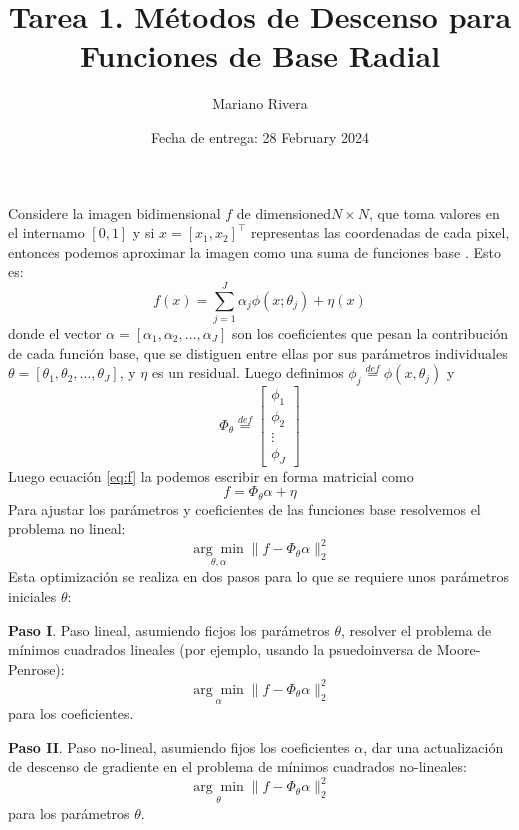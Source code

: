 \documentclass{article}
\title{Tarea 1. Métodos de Descenso para Funciones de Base Radial}
\author{Mariano Rivera}
\date{Fecha de entrega: 28 February 2024}
\newcommand{\define}{\overset{def}{=}}
\begin{document}
\maketitle

Considere la imagen bidimensional $f$ de dimensioned${N \times N}$, que toma valores en el internamo $[0,1]$ y si $x= [x_1,x_2]^\top$ representas las coordenadas de cada pixel, entonces podemos aproximar la imagen como una suma de funciones base . Esto es:
\begin{equation}
f(x) = \sum_{j=1}^J \alpha_j \phi(x; \theta_j) + \eta(x)    
\label{eq:f}
\end{equation}
donde el vector $\alpha = [\alpha_1, \alpha_2, \ldots, \alpha_J ]$ son los coeficientes que pesan la contribución de cada función base, que se distiguen entre ellas por sus parámetros individuales $\theta = [\theta_1, \theta_2, \ldots, \theta_J ]$, y $\eta$ es un residual. Luego definimos $\phi_j \define \phi(x, \theta_j)$ y
\begin{equation}
    \label{eq_phi}
    \Phi_\theta \define \begin{bmatrix}
        \phi_1 \\
        \phi_2 \\
        \vdots \\
        \phi_J
    \end{bmatrix}
\end{equation}
Luego ecuación \eqref{eq:f} la podemos escribir en forma matricial como
$$
f = \Phi_{\theta} \alpha + \eta
$$
Para ajustar los parámetros y coeficientes de las funciones base resolvemos el problema no lineal:
\begin{equation}
    \underset{\theta, \alpha}{\arg\min} \| f - \Phi_{\theta} \alpha \|_2^2
\end{equation}
Esta optimización se realiza en dos pasos para lo que se requiere unos parámetros iniciales $\theta$:

{\bf Paso I}. Paso lineal, asumiendo ficjos los parámetros $\theta$, resolver el problema de mínimos cuadrados lineales (por ejemplo, usando la psuedoinversa de Moore-Penrose):
\begin{equation}
    \underset{\alpha}{\arg\min} \| f - \Phi_{\theta} \alpha \|_2^2
\end{equation}
para los coeficientes.

{\bf Paso II}. Paso no-lineal, asumiendo fijos los coeficientes $\alpha$, dar una actualización de descenso de gradiente en el problema de mínimos cuadrados no-lineales:
\begin{equation}
    \underset{\theta}{\arg\min} \| f - \Phi_{\theta} \alpha \|_2^2
\end{equation}
para los parámetros $\theta$.
\end{document}
